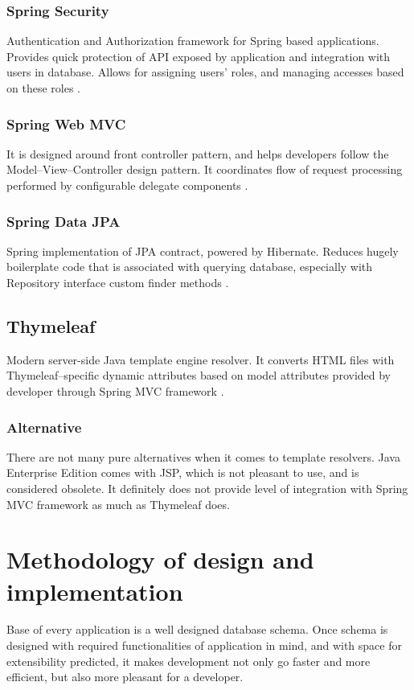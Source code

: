 \documentclass[a4paper,twoside,12pt]{book}
\begin{document}
      \subsubsection{Spring Security}
        Authentication and Authorization framework for Spring based applications. Provides quick protection of API exposed by application and
        integration with users in database. Allows for assigning users' roles, and managing accesses based on these roles \cite{bib:spring_security}.

      \subsubsection{Spring Web MVC}
        It is designed around front controller pattern, and helps developers follow the Model--View--Controller design pattern.
        It coordinates flow of request processing performed by configurable delegate components \cite{bib:spring_web_mvc}.
      
      \subsubsection{Spring Data JPA}
        Spring implementation of JPA contract, powered by Hibernate. Reduces hugely boilerplate code that is associated with querying database,
        especially with Repository interface custom finder methods \cite{bib:spring_data_jpa}.

    \subsection{Thymeleaf}
      Modern server-side Java template engine resolver. 
      It converts HTML files with Thymeleaf--specific dynamic attributes based on model attributes provided by developer through Spring MVC framework \cite{bib:thymeleaf}.
      
      \subsubsection{Alternative}
        There are not many pure alternatives when it comes to template resolvers. 
        Java Enterprise Edition comes with JSP, which is not pleasant to use, and is considered obsolete.
        It definitely does not provide level of integration with Spring MVC framework as much as Thymeleaf does.

  \section{Methodology of design and implementation}
    Base of every application is a well designed database schema. 
    Once schema is designed with required functionalities of application in mind, and with space for extensibility predicted,
    it makes development not only go faster and more efficient, but also more pleasant for a developer.
\end{document}
